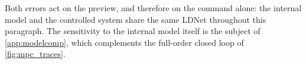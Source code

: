 Both errors act on the preview, and therefore on the command alone: the internal model and
the controlled system share the same LDNet throughout this paragraph. The sensitivity to the
internal model itself is the subject of \cref{app:modelcomp}, which complements the
full-order closed loop of \cref{fig:mpc_traces}.

\clearpage
